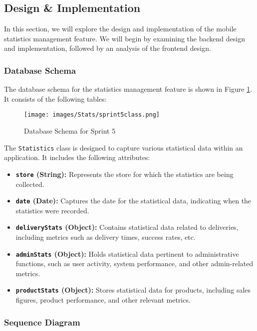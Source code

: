 \subsection{Design \& Implementation}

In this section, we will explore the design and implementation of the mobile statistics management feature. We will begin by examining the backend design and implementation, followed by an analysis of the frontend design.

\subsubsection{Database Schema}

The database schema for the statistics management feature is shown in Figure \ref{fig:db_schema_sprint5}. It consists of the following tables:

\begin{figure}[H]
    \centering
    \texttt{[image: images/Stats/sprint5class.png]}
    \caption{Database Schema for Sprint 5}
    \label{fig:db_schema_sprint5}
\end{figure}

The \texttt{Statistics} class is designed to capture various statistical data within an application. It includes the following attributes:

\begin{itemize}
    \item \textbf{\texttt{store} (String):} Represents the store for which the statistics are being collected.
    \item \textbf{\texttt{date} (Date):} Captures the date for the statistical data, indicating when the statistics were recorded.
    \item \textbf{\texttt{deliveryStats} (Object):} Contains statistical data related to deliveries, including metrics such as delivery times, success rates, etc.
    \item \textbf{\texttt{adminStats} (Object):} Holds statistical data pertinent to administrative functions, such as user activity, system performance, and other admin-related metrics.
    \item \textbf{\texttt{productStats} (Object):} Stores statistical data for products, including sales figures, product performance, and other relevant metrics.
\end{itemize}

\subsubsection{Sequence Diagram}

